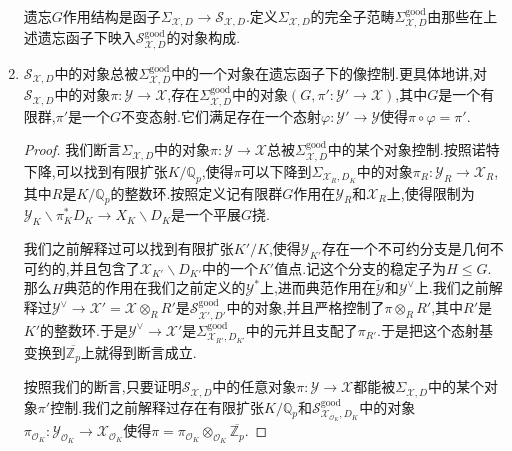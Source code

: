 \begin{enumerate}
    遗忘$G$作用结构是函子$\Sigma_{\mathcal{X},D}\to\mathcal{S}_{\mathcal{X},D}$.定义$\Sigma_{\mathcal{X},D}$的完全子范畴$\Sigma_{\mathcal{X},D}^{\mathrm{good}}$由那些在上述遗忘函子下映入$\mathcal{S}_{\mathcal{X},D}^{\mathrm{good}}$的对象构成.
    \item $\mathcal{S}_{\mathcal{X},D}$中的对象总被$\Sigma_{\mathcal{X},D}^{\mathrm{good}}$中的一个对象在遗忘函子下的像控制.更具体地讲,对$\mathcal{S}_{\mathcal{X},D}$中的对象$\pi:\mathcal{Y}\to\mathcal{X}$,存在$\Sigma_{\mathcal{X},D}^{\mathrm{good}}$中的对象$(G,\pi':\mathcal{Y}'\to\mathcal{X})$,其中$G$是一个有限群,$\pi'$是一个$G$不变态射.它们满足存在一个态射$\varphi:\mathcal{Y}'\to\mathcal{Y}$使得$\pi\circ\varphi=\pi'$.
    \begin{proof}
    	
    	我们断言$\Sigma_{\mathcal{X},D}$中的对象$\pi:\mathcal{Y}\to\mathcal{X}$总被$\Sigma_{\mathcal{X},D}^{\mathrm{good}}$中的某个对象控制.按照诺特下降,可以找到有限扩张$K/\mathbb{Q}_p$,使得$\pi$可以下降到$\Sigma_{\mathcal{X}_R,D_K}$中的对象$\pi_R:\mathcal{Y}_R\to\mathcal{X}_R$,其中$R$是$K/\mathbb{Q}_p$的整数环.按照定义记有限群$G$作用在$\mathcal{Y}_R$和$\mathcal{X}_R$上,使得限制为$\mathcal{Y}_K\backslash\pi_K^*D_K\to X_K\backslash D_K$是一个平展$G$挠.
    	
    	\qquad
    	
    	我们之前解释过可以找到有限扩张$K'/K$,使得$\mathcal{Y}_{K'}$存在一个不可约分支是几何不可约的,并且包含了$\mathcal{X}_{K'}\backslash D_{K'}$中的一个$K'$值点.记这个分支的稳定子为$H\le G$.那么$H$典范的作用在我们之前定义的$\mathcal{Y}^*$上,进而典范作用在$\widetilde{\mathcal{Y}}$和$\mathcal{Y}^{\vee}$上.我们之前解释过$\mathcal{Y}^{\vee}\to\mathcal{X}'=\mathcal{X}\otimes_RR'$是$\mathcal{S}_{\mathcal{X}',D'}^{\mathrm{good}}$中的对象,并且严格控制了$\pi\otimes_RR'$,其中$R'$是$K'$的整数环.于是$\mathcal{Y}^{\vee}\to\mathcal{X}'$是$\Sigma_{\mathcal{X}_{R'},D_{K'}}^{\mathrm{good}}$中的元并且支配了$\pi_{R'}$.于是把这个态射基变换到$\overline{\mathbb{Z}_p}$上就得到断言成立.
    	
    	\qquad
    	
    	按照我们的断言,只要证明$\mathcal{S}_{\mathcal{X},D}$中的任意对象$\pi:\mathcal{Y}\to\mathcal{X}$都能被$\Sigma_{\mathcal{X},D}$中的某个对象$\pi'$控制.我们之前解释过存在有限扩张$K/\mathbb{Q}_p$和$\mathcal{S}_{\mathcal{X}_{\mathscr{O}_K},D_K}^{\mathrm{good}}$中的对象$\pi_{\mathscr{O}_K}:\mathcal{Y}_{\mathscr{O}_K}\to\mathcal{X}_{\mathscr{O}_K}$使得$\pi=\pi_{\mathscr{O}_K}\otimes_{\mathscr{O}_K}\overline{\mathbb{Z}_p}$.
    	

\end{proof}
\end{enumerate}
